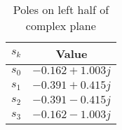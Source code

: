 \begin{table}[!h]
    \centering
    \begin{tabular}{|c|c|}
    \hline
       $s_k$  &  \textbf{Value}\\
    \hline
       $s_0$  & $-0.162 + 1.003j$\\
    \hline
       $s_1$  & $-0.391 + 0.415j$\\
    \hline
       $s_2$  & $-0.391 - 0.415j$\\
    \hline
       $s_3$  & $-0.162 - 1.003j$\\
    \hline
    \end{tabular}
    \caption{Poles on left half of complex plane}
    \label{tab:2}
\end{table}
